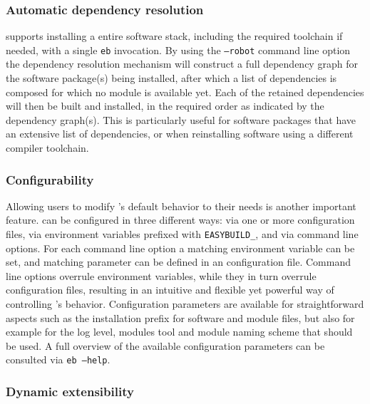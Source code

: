 \subsubsection{Automatic dependency resolution}
\label{sec:eb_dependency_resolution}

\easybuild{} supports installing a entire software stack, including the required
toolchain if needed, with a single \texttt{\small eb} invocation. By using the
\texttt{\small --robot} command line option the dependency resolution mechanism will
construct a full dependency graph for the software package(s) being installed, after
which a list of dependencies is composed for which no module is available yet. Each of
the retained dependencies will then be built and installed, in the required order as
indicated by the dependency graph(s). This is particularly useful for software
packages that have an extensive list of dependencies, or when reinstalling software
using a different compiler toolchain.

\subsubsection{Configurability}
\label{sec:eb_configurability}

Allowing users to modify \easybuild{}'s default behavior to their needs is another
important feature. \easybuild{} can be configured in three different ways: via one or
more configuration files, via environment variables prefixed with
\texttt{\small EASYBUILD\_}, and via command line options. For each command line
option a matching environment variable can be set, and matching parameter can be
defined in an configuration file. Command line options overrule environment
variables, while they in turn overrule configuration files, resulting in an
intuitive and flexible yet powerful way of controlling \easybuild{}'s behavior.
Configuration parameters are available for straightforward aspects such as the
installation prefix for software and module files, but also for example for the
log level, modules tool and module naming scheme that should be used. A full
overview of the available configuration parameters can be consulted via
\texttt{\small eb --help}.

\subsubsection{Dynamic extensibility}
\label{sec:eb_extensible}

